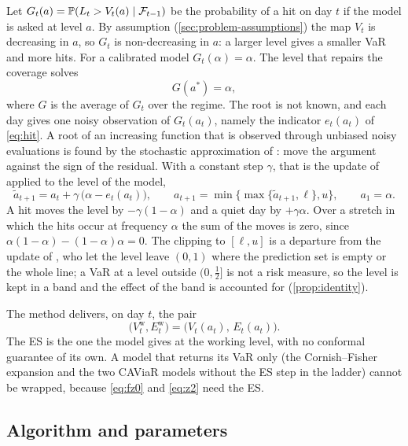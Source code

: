 Let $G_t(a) = \mathbb{P}(L_t > V_t(a) \mid \mathcal{F}_{t-1})$ be the probability of a hit on day $t$ if the model is asked at level $a$. By assumption (\cref{sec:problem-assumptions}) the map $V_t$ is decreasing in $a$, so $G_t$ is non-decreasing in $a$: a larger level gives a smaller VaR and more hits. For a calibrated model $G_t(\alpha) = \alpha$. The level that repairs the coverage solves
\begin{equation}
G(a^*) = \alpha,
\label{eq:root}
\end{equation}
where $G$ is the average of $G_t$ over the regime. The root is not known, and each day gives one noisy observation of $G_t(a_t)$, namely the indicator $e_t(a_t)$ of \cref{eq:hit}. A root of an increasing function that is observed through unbiased noisy evaluations is found by the stochastic approximation of \citet{robbins1951}: move the argument against the sign of the residual. With a constant step $\gamma$, that is the update of \citet{gibbs2021} applied to the level of the model,
\begin{equation}
\tilde a_{t+1} = a_t + \gamma\,\bigl(\alpha - e_t(a_t)\bigr), \qquad a_{t+1} = \min\{\max\{\tilde a_{t+1}, \ell\}, u\}, \qquad a_1 = \alpha.
\label{eq:update}
\end{equation}
A hit moves the level by $-\gamma(1-\alpha)$ and a quiet day by $+\gamma\alpha$. Over a stretch in which the hits occur at frequency $\alpha$ the sum of the moves is zero, since $\alpha(1-\alpha) - (1-\alpha)\alpha = 0$. The clipping to $[\ell, u]$ is a departure from the update of \citet{gibbs2021}, who let the level leave $(0,1)$ where the prediction set is empty or the whole line; a VaR at a level outside $(0, \tfrac12]$ is not a risk measure, so the level is kept in a band and the effect of the band is accounted for (\cref{prop:identity}).

The method delivers, on day $t$, the pair
\begin{equation}
\bigl(V_t^{\mathrm{w}}, E_t^{\mathrm{w}}\bigr) = \bigl(V_t(a_t),\, E_t(a_t)\bigr).
\label{eq:wrapped-pair}
\end{equation}
The ES is the one the model gives at the working level, with no conformal guarantee of its own. A model that returns its VaR only (the Cornish--Fisher expansion and the two CAViaR models without the ES step in the ladder) cannot be wrapped, because \cref{eq:fz0} and \cref{eq:z2} need the ES.

\subsection{Algorithm and parameters}
\label{sec:method-algorithm}

